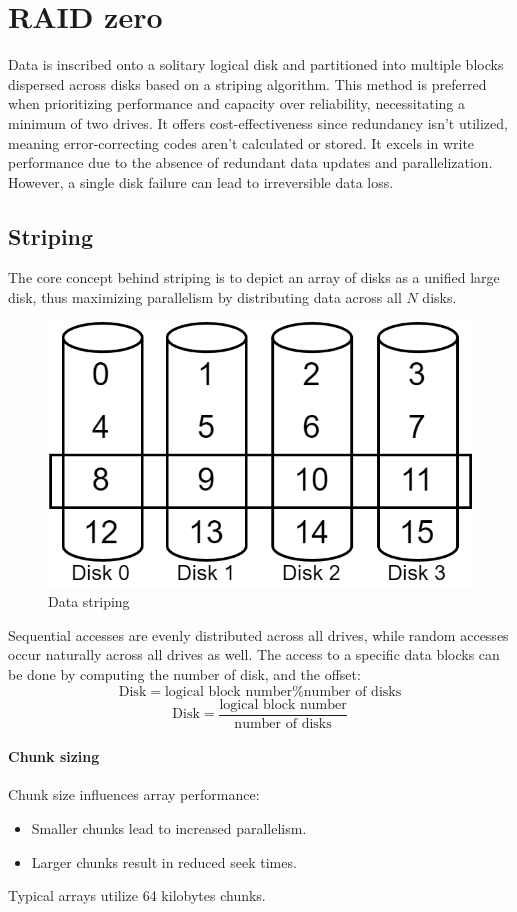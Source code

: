 \section{RAID zero}

Data is inscribed onto a solitary logical disk and partitioned into multiple blocks dispersed across disks based on a striping algorithm. 
This method is preferred when prioritizing performance and capacity over reliability, necessitating a minimum of two drives. 
It offers cost-effectiveness since redundancy isn't utilized, meaning error-correcting codes aren't calculated or stored. 
It excels in write performance due to the absence of redundant data updates and parallelization.
However, a single disk failure can lead to irreversible data loss.

\subsection{Striping}
The core concept behind striping is to depict an array of disks as a unified large disk, thus maximizing parallelism by distributing data across all $N$ disks.
\begin{figure}[H]
    \centering
    \includegraphics[width=0.4\linewidth]{images/strip.png}
    \caption{Data striping}
\end{figure}
Sequential accesses are evenly distributed across all drives, while random accesses occur naturally across all drives as well.
The access to a specific data blocks can be done by computing the number of disk, and the offset: 
\[\text{Disk}=\text{logical block number} \% \text{number of disks}\]
\[\text{Disk}=\dfrac{\text{logical block number}}{\text{number of disks}}\]

\paragraph*{Chunk sizing}
Chunk size influences array performance:
\begin{itemize}
    \item Smaller chunks lead to increased parallelism.
    \item Larger chunks result in reduced seek times.
\end{itemize}
Typical arrays utilize 64 kilobytes chunks.

